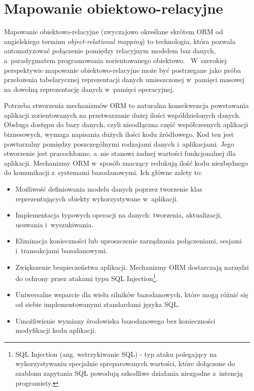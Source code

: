 
\chapter{Mapowanie obiektowo-relacyjne}
\label{chap:object_relational_mapping}

Mapowanie obiektowo-relacyjne (zwyczajowo określane skrótem ORM od angielskiego terminu \emph{object-relational mapping}) to technologia, która pozwala automatyzować połączenie pomiędzy relacyjnym modelem baz danych, a~paradygmatem programowania zorientowanego obiektowo.~\cite{orm_definition} W~szerokiej perspektywie mapowanie obiektowo-relacyjne może być postrzegane jako próba przełożenia tabelarycznej reprezentacji danych umieszczonej w~pamięci masowej na dowolną reprezentację danych w~pamięci operacyjnej.~\cite{fowler_orm_hate} 

Potrzeba stworzenia mechanizmów ORM to naturalna konsekwencja powstawania aplikacji zorientowanych na przetwarzanie dużej ilości współdzielonych danych. Obsługa dostępu do bazy danych, czyli nieodłączna część współczesnych aplikacji biznesowych, wymaga napisania dużych ilości kodu źródłowego. Kod ten jest powtarzalny pomiędzy poszczególnymi rodzajami danych i~aplikacjami. Jego stworzenie jest pracochłonne, a~nie stanowi żadnej wartości funkcjonalnej dla aplikacji. Mechanizmy ORM w~sposób znaczący redukują ilość kodu niezbędnego do komunikacji z~systemami bazodanowymi. Ich główne zalety to:

\begin{itemize}
	\item Możliwość definiowania modelu danych poprzez tworzenie klas reprezentujących obiekty wykorzystywane w~aplikacji.
	\item Implementacja typowych operacji na danych: tworzenia, aktualizacji, usuwania i~wyszukiwania.
	\item Eliminacja konieczności lub uproszczenie zarządzania połączeniami, sesjami i~transakcjami bazodanowymi.
	\item Zwiększenie bezpieczeństwa aplikacji. Mechanizmy ORM dostarczają narzędzi do ochrony przez atakami typu SQL Injection\footnote{SQL Injection (ang. wstrzykiwanie SQL) - typ ataku polegający na wykorzystywaniu specjalnie spreparowanych wartości, które dołączone do szablonu zapytania SQL powodują szkodliwe działania niezgodne z~intencją programisty.}.~\cite{orm_sql_injection_protection}
	\item Uniwersalne wsparcie dla wielu silników bazodanowych, które mogą różnić się od siebie implementowanymi standardami języka SQL. 
	\item Umożliwienie wymiany środowiska bazodanowego bez konieczności modyfikacji kodu aplikacji.
\end{itemize}

